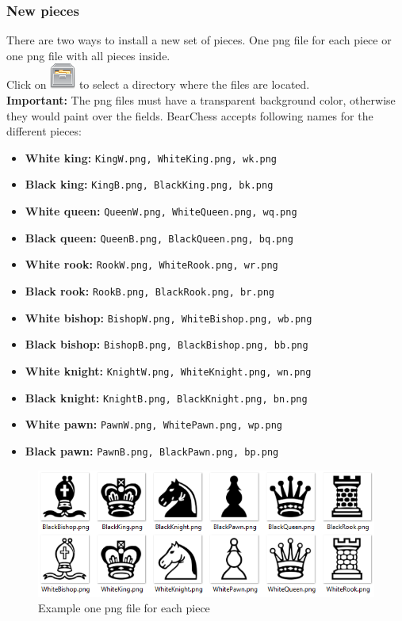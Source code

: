 \documentclass[11pt,a4paper]{article}
\begin{document}
	\subsubsection{New pieces}
	There are two ways to install a new set of pieces. One png file for each piece or one png file with all pieces inside. \\
	Click on \includegraphics[scale=0.5]{file_manager.png} to select a directory where the files are located.\\ \textbf{Important:} The png files must have a transparent background color, otherwise they would paint over the fields.
	BearChess accepts following names for the different pieces:
	\begin{itemize}
		\item \textbf{White king:} \verb|KingW.png, WhiteKing.png, wk.png|
		\item \textbf{Black king:} \verb|KingB.png, BlackKing.png, bk.png|
		\item \textbf{White queen:} \verb|QueenW.png, WhiteQueen.png, wq.png|
		\item \textbf{Black queen:} \verb|QueenB.png, BlackQueen.png, bq.png|
		\item \textbf{White rook:} \verb|RookW.png, WhiteRook.png, wr.png|
		\item \textbf{Black rook:} \verb|RookB.png, BlackRook.png, br.png|
		\item \textbf{White bishop:} \verb|BishopW.png, WhiteBishop.png, wb.png|
		\item \textbf{Black bishop:} \verb|BishopB.png, BlackBishop.png, bb.png|
		\item \textbf{White knight:} \verb|KnightW.png, WhiteKnight.png, wn.png|
		\item \textbf{Black knight:} \verb|KnightB.png, BlackKnight.png, bn.png|
		\item \textbf{White pawn:} \verb|PawnW.png, WhitePawn.png, wp.png|
		\item \textbf{Black pawn:} \verb|PawnB.png, BlackPawn.png, bp.png|
	\end{itemize}
	
	
	\begin{figure}[H]
		\centering
		\includegraphics[scale=0.7]{Pieces.png}
		\caption{Example one png file for each piece}
		\label{fig:Pieces}
	\end{figure}
	
\end{document}
